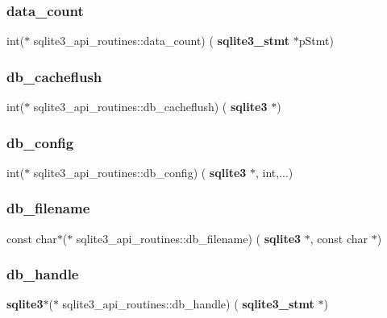 \subsubsection{data\_count}
{\footnotesize\ttfamily int($\ast$ sqlite3\+\_\+api\+\_\+routines\+::data\+\_\+count) (\textbf{ sqlite3\+\_\+stmt} $\ast$p\+Stmt)}

\mbox{\label{structsqlite3__api__routines_affc9f6591079f5929d8cfbca79927dcc}} 
\subsubsection{db\_cacheflush}
{\footnotesize\ttfamily int($\ast$ sqlite3\+\_\+api\+\_\+routines\+::db\+\_\+cacheflush) (\textbf{ sqlite3} $\ast$)}

\mbox{\label{structsqlite3__api__routines_aa0410a68af506e04f9b5ce6f7d2c195f}} 
\subsubsection{db\_config}
{\footnotesize\ttfamily int($\ast$ sqlite3\+\_\+api\+\_\+routines\+::db\+\_\+config) (\textbf{ sqlite3} $\ast$, int,...)}

\mbox{\label{structsqlite3__api__routines_a100ccb514682b7eb4280ababd67e9831}} 
\subsubsection{db\_filename}
{\footnotesize\ttfamily const char$\ast$($\ast$ sqlite3\+\_\+api\+\_\+routines\+::db\+\_\+filename) (\textbf{ sqlite3} $\ast$, const char $\ast$)}

\mbox{\label{structsqlite3__api__routines_a202912ed0777c34ef98ab262204d0c6e}} 
\subsubsection{db\_handle}
{\footnotesize\ttfamily \textbf{ sqlite3}$\ast$($\ast$ sqlite3\+\_\+api\+\_\+routines\+::db\+\_\+handle) (\textbf{ sqlite3\+\_\+stmt} $\ast$)}

